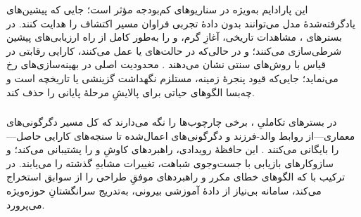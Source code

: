 این پارادایم به‌ویژه در سناریوهای کم‌بودجه مؤثر است؛ جایی که پیشین‌های یادگرفته‌شدهٔ مدل می‌توانند بدون دادهٔ تجربی فراوان مسیر اکتشاف را هدایت کنند. در بسترهای ، مشاهدات تاریخی، آغازِ گرم،  و  را به‌طور کامل از راه  ارزیابی‌های پیشین شرطی‌سازی می‌کنند؛ و در حالی‌که در حالت‌های  یا  عمل می‌کنند، کارایی رقابتی در قیاس با روش‌های سنتی نشان می‌دهند \cite{liu2024LLAMBO}. محدودیت اصلی در بهینه‌سازی‌های  رخ می‌نماید؛ جایی‌که قیود پنجرهٔ زمینه، مستلزم نگهداشت گزینشی یا  تاریخچه است و چه‌بسا الگوهای حیاتی برای پالایشِ مرحلهٔ پایانی را حذف کند.

\subsubsection{\protect{}}

در بسترهای تکاملیِ ، برخی چارچوب‌ها  را نگه می‌دارند که کل مسیر دگرگونی‌های معماری—از روابط والد-فرزند و دگرگونی‌های اعمال‌شده تا سنجه‌های کارایی حاصل—را بایگانی می‌کنند \cite{Yang2025NADER}. این حافظهٔ رویدادی، راهبردهای کاوشِ  و  را پشتیبانی می‌کند؛ و سازوکارهای بازیابی با جست‌وجوی شباهت، تغییرات مشابهِ گذشته را می‌یابند. در ترکیب با  که الگوهای خطای مکرر و راهبردهای موفقِ طراحی را از سوابق استخراج می‌کند، سامانه بی‌نیاز از دادهٔ آموزشی بیرونی، به‌تدریج سرانگشتانِ حوزه‌ویژه می‌پرورد.


